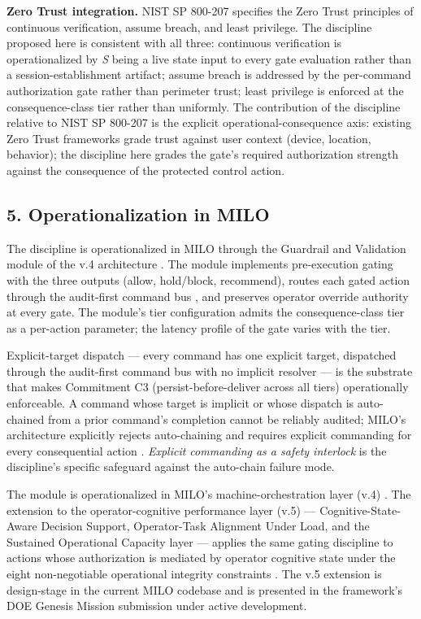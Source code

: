 \textbf{Zero Trust integration.} NIST SP 800-207 \cite{ref6} specifies the
Zero Trust principles of continuous verification, assume breach, and
least privilege. The discipline proposed here is consistent with all
three: continuous verification is operationalized by \emph{S} being a
live state input to every gate evaluation rather than a
session-establishment artifact; assume breach is addressed by the
per-command authorization gate rather than perimeter trust; least
privilege is enforced at the consequence-class tier rather than
uniformly. The contribution of the discipline relative to NIST SP
800-207 is the explicit operational-consequence axis: existing Zero
Trust frameworks grade trust against user context (device, location,
behavior); the discipline here grades the gate's required authorization
strength against the consequence of the protected control action.

\subsection{5. Operationalization in
MILO}\label{operationalization-in-milo}

The discipline is operationalized in MILO through the Guardrail and
Validation module of the v.4 architecture \cite{ref7}. The module implements
pre-execution gating with the three outputs (allow, hold/block,
recommend), routes each gated action through the audit-first command bus
\cite{ref3}, and preserves operator override authority at every gate. The
module's tier configuration admits the consequence-class tier as a
per-action parameter; the latency profile of the gate varies with the
tier.

Explicit-target dispatch --- every command has one explicit target,
dispatched through the audit-first command bus with no implicit resolver
\cite{ref3} --- is the substrate that makes Commitment C3
(persist-before-deliver across all tiers) operationally enforceable. A
command whose target is implicit or whose dispatch is auto-chained from
a prior command's completion cannot be reliably audited; MILO's
architecture explicitly rejects auto-chaining and requires explicit
commanding for every consequential action \cite{ref8}. \emph{Explicit
commanding as a safety interlock} \cite{ref8} is the discipline's specific
safeguard against the auto-chain failure mode.

The module is operationalized in MILO's machine-orchestration layer
(v.4) \cite{ref3}. The extension to the operator-cognitive performance layer
(v.5) --- Cognitive-State-Aware Decision Support, Operator-Task
Alignment Under Load, and the Sustained Operational Capacity layer ---
applies the same gating discipline to actions whose authorization is
mediated by operator cognitive state under the eight non-negotiable
operational integrity constraints \cite{ref9}. The v.5 extension is
design-stage in the current MILO codebase and is presented in the
framework's DOE Genesis Mission submission \cite{ref9} under active
development.


